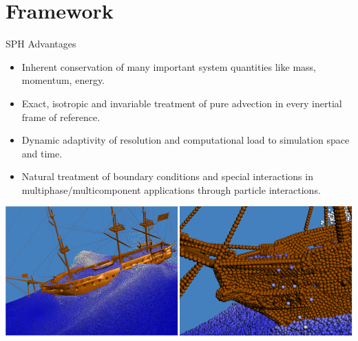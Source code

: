 \documentclass[8pt,sans,mathserif,aspectratio=43]{beamer}
\begin{document}
\section{Framework}

\begin{frame}{SPH Advantages}
  \begin{itemize}
  \item Inherent conservation of many important system quantities like mass,
    momentum, energy.\pause
  \item Exact, isotropic and invariable treatment of pure advection in every
    inertial frame of reference.\pause
  \item Dynamic adaptivity of resolution and computational load to simulation
    space and time.\pause
  \item Natural treatment of boundary conditions and special interactions in
    multiphase/multicomponent applications through particle interactions.
  \end{itemize}
  \includegraphics[width=\textwidth]{figures/boundary-particles.pdf}
\end{frame}

\end{document}
